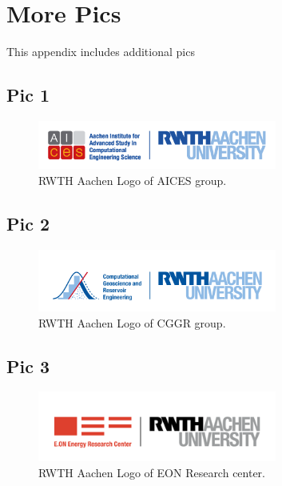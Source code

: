 \chapter{More Pics}\label{appendix:B}
This appendix includes additional pics

\section{Pic 1}
\begin{figure}[H]
\noindent\includegraphics[width=0.7\textwidth]{Titlepage_files/RWTH_AICES_logo.png}
\caption[Logo AICES]{RWTH Aachen Logo of AICES group.}
\label{figure:aices}
\end{figure}

\section{Pic 2}
\begin{figure}[H]
\noindent\includegraphics[width=0.7\textwidth]{Titlepage_files/RWTH_CGGR_logo.png}
\caption[Logo CGGR]{RWTH Aachen Logo of CGGR group.}
\label{figure:cggr}
\end{figure}

\section{Pic 3}
\begin{figure}[H]
\noindent\includegraphics[width=0.7\textwidth]{Titlepage_files/RWTH_EONERC_logo.png}
\caption[Logo EONRC]{RWTH Aachen Logo of EON Research center.}
\label{figure:eonrc}
\end{figure}